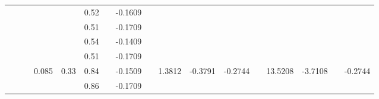 \documentclass[a4paper,12pt]{article}
\begin{document}
\begin{landscape}
\begin{table}[]
\begin{tabular}{|c|c|c|c|c|c|c|c|c|c|c|c|c|c|c|c|c|}
                     &                           &                         &                         &                        & 0.52 &                          & -0.1609 &                          &                          &                           &                           &                        &                           &                                        &                           &                           \\ \cline{6-6} \cline{8-8}
                     &                           &                         &                         &                        & 0.51 &                          & -0.1709 &                          &                          &                           &                           &                        &                           &                                        &                           &                           \\ \cline{6-6} \cline{8-8}
                     &                           &                         &                         &                        & 0.54 &                          & -0.1409 &                          &                          &                           &                           &                        &                           &                                        &                           &                           \\ \cline{6-6} \cline{8-8}
                     &                           &                         &                         &                        & 0.51 &                          & -0.1709 &                          &                          &                           &                           &                        &                           &                                        &                           &                           \\ \cline{4-6} \cline{8-8} \cline{10-12} \cline{14-15} \cline{17-17} 
                     &                           &                         & \multirow{10}{*}{0.085} & \multirow{10}{*}{0.33} & 0.84 &                          & -0.1509 &                          & \multirow{10}{*}{1.3812} & \multirow{10}{*}{-0.3791} & \multirow{10}{*}{-0.2744} &                        & \multirow{10}{*}{13.5208} & \multirow{10}{*}{-3.7108} &                           & \multirow{10}{*}{-0.2744} \\ \cline{6-6} \cline{8-8}
                     &                           &                         &                         &                        & 0.86 &                          & -0.1709 &                          &                          &                           &                           &                        &                           &                                        &                           &                           \\ \cline{6-6} \cline{8-8}

\end{tabular}
\end{table}
\end{landscape}
\end{document}

